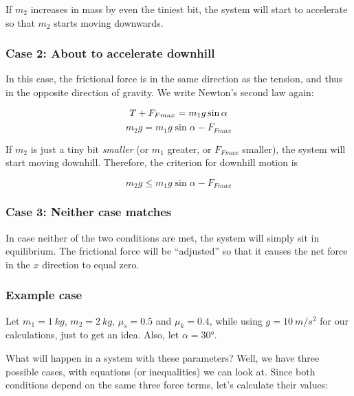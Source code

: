 If $m_2$ increases in mass by even the tiniest bit, the system will start to accelerate so that $m_2$ starts moving downwards.

\subsubsection{Case 2: About to accelerate downhill}

In this case, the frictional force is in the same direction as the tension, and thus in the opposite direction of gravity. We write Newton's second law again:

\begin{equation}
T + F_{Fmax} = m_1 g \sin \alpha\\
\end{equation}
\begin{equation}
m_2 g = m_1 g \sin \alpha - F_{Fmax}
\end{equation}

If $m_2$ is just a tiny bit \emph{smaller} (or $m_1$ greater, or $F_{Fmax}$ smaller), the system will start moving downhill. Therefore, the criterion for downhill motion is

\begin{equation}
m_2 g \le m_1 g \sin \alpha - F_{Fmax}
\end{equation}

\subsubsection{Case 3: Neither case matches}

In case neither of the two conditions are met, the system will simply sit in equilibrium. The frictional force will be ``adjusted'' so that it causes the net force in the $x$ direction to equal zero.

\subsubsection{Example case}

Let $m_1 = \SI{1}{kg}$, $m_2 = \SI{2}{kg}$, $\mu_s = 0.5$ and $\mu_k = 0.4$, while using $g = \SI{10}{m/s^2}$ for our calculations, just to get an idea. Also, let $\alpha = \ang{30}$.

What will happen in a system with these parameters? Well, we have three possible cases, with equations (or inequalities) we can look at. Since both conditions depend on the same three force terms, let's calculate their values:

